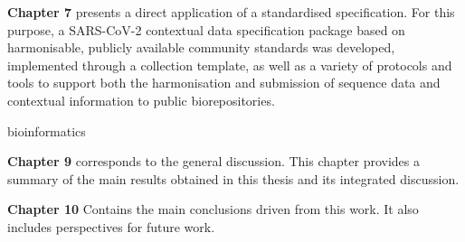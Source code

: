 \textbf{Chapter 7} presents a direct application of a standardised specification. For this purpose, a SARS-CoV-2 contextual data specification package based on harmonisable, publicly available community standards was developed, implemented through a collection template, as well as a variety of protocols and tools to support both the harmonisation and submission of sequence data and contextual information to public biorepositories. 

bioinformatics 

\textbf{Chapter 9} corresponds to the general discussion. This chapter provides a summary of the main results obtained in this thesis and its integrated discussion. 

\textbf{Chapter 10} Contains the main conclusions driven from this work. It also includes perspectives for future work. 